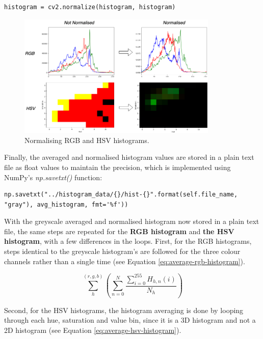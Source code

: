 \begin{lstlisting}[numbers=none]
histogram = cv2.normalize(histogram, histogram)
\end{lstlisting}

\begin{figure}[h] 
\centerline{\includegraphics[width=0.85\textwidth]{figures/implementation/normalise-histogram.png}}
\caption{\label{fig:implementation-normalise-histogram}Normalising RGB and HSV histograms.}
\end{figure}

Finally, the averaged and normalised histogram values are stored in a plain text file as float values to maintain the precision, which is implemented using NumPy's \textit{np.savetxt()} function:

\begin{lstlisting}[numbers=none]
np.savetxt("../histogram_data/{}/hist-{}".format(self.file_name, "gray"), avg_histogram, fmt='%f'))
\end{lstlisting}

With the greyscale averaged and normalised histogram now stored in a plain text file, the same steps are repeated for the \textbf{RGB histogram} and \textbf{the HSV histogram}, with a few differences in the loops. First, for the RGB histograms, steps identical to the greyscale histogram's are followed for the three colour channels rather than a single time (see Equation \ref{eq:average-rgb-histogram}).

\begin{equation}
\label{eq:average-rgb-histogram}
    \sum_{h}^{(r,g,b)} (\sum_{n=0}^{N} \frac{\sum_{i=0}^{255} H_{h,n}(i)}{N_h})
\end{equation}

Second, for the HSV histograms, the histogram averaging is done by looping through each hue, saturation and value bin, since it is a 3D histogram and not a 2D histogram (see Equation \ref{eq:average-hsv-histogram}).

